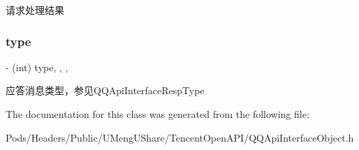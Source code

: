 请求处理结果 \mbox{\label{interface_q_q_base_resp_ad2597dde05de203fe8abf701f1e13485}} 
\subsubsection{\texorpdfstring{type}{type}}
{\footnotesize\ttfamily -\/ (int) type\hspace{0.3cm}{\ttfamily [read]}, {\ttfamily [write]}, {\ttfamily [nonatomic]}, {\ttfamily [assign]}}

应答消息类型，参见Q\+Q\+Api\+Interface\+Resp\+Type 

The documentation for this class was generated from the following file\+:\begin{DoxyCompactItemize}
\item 
Pods/\+Headers/\+Public/\+U\+Meng\+U\+Share/\+Tencent\+Open\+A\+P\+I/Q\+Q\+Api\+Interface\+Object.\+h\end{DoxyCompactItemize}
